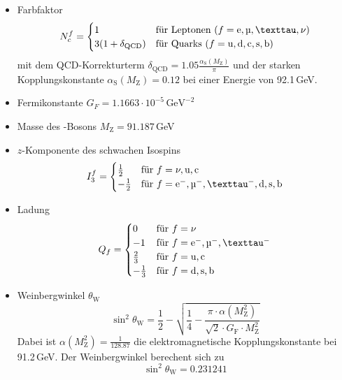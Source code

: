 \begin{itemize}
    \item Farbfaktor
    \begin{equation}
        N_c^f =
        \begin{cases}
            1 & \text{für Leptonen } (f = \text{e}, \text{\textmu}, \text{\texttau}, \nu) \\
            3 (1 + \delta_\text{QCD}) & \text{für Quarks } (f = \text{u,\,d,\,c,\,s,\,b})
        \end{cases}
    \end{equation}
    mit dem QCD-Korrekturterm $\delta_\text{QCD} = 1.05 \frac{\alpha_\text{S}(M_\text{Z})}{\pi}$ und der starken Kopplungskonstante
    $\alpha_\text{S}(M_\text{Z}) = 0.12$ bei einer Energie von 92.1\,GeV.
    \item Fermikonstante $G_F = 1.1663 \cdot 10^{-5}\,\text{GeV}^{-2}$ \cite{manual}
    \item Masse des \Z-Bosons $M_\text{Z}=91.187$\,GeV
    \item $z$-Komponente des schwachen Isospins
    \begin{equation}
        I_3^f =
        \begin{cases}
            \frac{1}{2}  & \text{für } f = \nu, \text{u,\,c} \\
            -\frac{1}{2} & \text{für } f = \text{\elm,\,\textmu$^-$,\,\texttau$^-$,\,d,\,s,\,b}
        \end{cases}
    \end{equation}
    \item Ladung
    \begin{equation}
        Q_f =
        \begin{cases}
            0			& \text{für } f = \nu \\
         -1			& \text{für } f = \text{\elm,\,\textmu$^-$,\,\texttau$^-$} \\
      \frac{2}{3}	& \text{für } f = \text{u,\,c} \\
     -\frac{1}{3}& \text{für } f = \text{d,\,s,\,b}
        \end{cases}
    \end{equation}
    \item Weinbergwinkel $\theta_\text{W}$
    \begin{equation}
        \sin^2 \theta_\text{W} = \frac{1}{2} - \sqrt{\frac{1}{4} - \frac{\pi \cdot \alpha \left( M_\text{Z}^2 \right) }{\sqrt{2} \cdot G_\text{F} \cdot M_\text{Z}^2}}
    \end{equation}
    Dabei ist $\alpha \left( M_\text{Z}^2 \right) = \frac{1}{128.87}$ die elektromagnetische Kopplungskonstante bei 91.2\,GeV. Der Weinbergwinkel
    berechent sich zu
    \begin{equation}
        \sin^2 \theta_\text{W} = 0.231241
    \end{equation}
\end{itemize}
